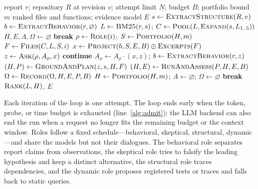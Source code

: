 \documentclass[letterpaper,journal]{IEEEtran}
\newcommand{\tool}{MORPH-FL}
\begin{document}
\begin{algorithm}[t]
\caption{The \tool{} investigation loop}\label{alg:controller}
\begin{algorithmic}[1]\small
\Require report $r$; repository $R$ at revision $v$; attempt limit $N$; budget $B$; portfolio bound $m$
\Ensure ranked files and functions; evidence model $E$
\State $s\gets\textsc{ExtractStructure}(R,v)$\label{alg:prep-start}
\State $b\gets\textsc{ExtractBehavior}(r,\varnothing)$
\State $L\gets\textsc{BM25}(r,s)$;\; $C\gets\textsc{Pool}(L,\textsc{Expand}(s,L_{1..5}))$
\State $H,E,A,\Omega\gets\varnothing$\label{alg:prep-end}
  \label{alg:admit} \State \textbf{break} \EndIf
  \State $\rho\gets\textsc{Role}(i)$;\; $S\gets\textsc{Portfolio}(H,m)$\label{alg:select}
  \State $F\gets\textsc{Files}(C,L,S,i)$
  \State $x\gets\textsc{Project}(b,S,E,B)\oplus\textsc{Excerpts}(F)$\label{alg:project}
  \State $z\gets\textsc{Ask}(\rho,A_\rho,x)$ \label{alg:ask}
  \label{alg:reject} \State \textbf{continue}  \EndIf
  \State $A_\rho\gets A_\rho\cdot(x,z)$;\; $b\gets\textsc{ExtractBehavior}(r,z)$\label{alg:accept}
  \State $(H,P)\gets\textsc{GroundAndPlan}(z,s,H,F)$\label{alg:ground}
  \State $(H,E)\gets\textsc{RunAndAssess}(P,H,E,B)$\label{alg:run}
  \State $\Omega\gets\textsc{Record}(\Omega,H,E,P,B)$\label{alg:record}
  \label{alg:stagnated}
    \State $H\gets\textsc{Portfolio}(H,m)$;\; $A\gets\varnothing$;\; $\Omega\gets\varnothing$ \label{alg:reset}
  \EndIf
  \label{alg:stop} \State \textbf{break} \EndIf
\EndFor
\State \Return $\textsc{Rank}(L,H)$, $E$\label{alg:rank}
\end{algorithmic}
\end{algorithm}

Each iteration of the loop is one attempt. The loop ends early when the token, probe, or time budget is exhausted (line~\ref{alg:admit}); the LLM backend can also end the run when a request no longer fits the remaining budget or the context window. Roles follow a fixed schedule---behavioral, skeptical, structural, dynamic---and share the models but not their dialogues. The behavioral role separates report claims from observations, the skeptical role tries to falsify the leading hypothesis and keep a distinct alternative, the structural role traces dependencies, and the dynamic role proposes registered tests or traces and falls back to static queries.
\end{document}
